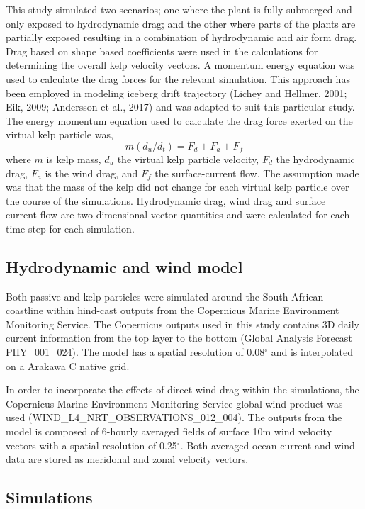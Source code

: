\documentclass[
]{article}
\begin{document}
This study simulated two scenarios; one where the plant is fully
submerged and only exposed to hydrodynamic drag; and the other where
parts of the plants are partially exposed resulting in a combination of
hydrodynamic and air form drag. Drag based on shape based coefficients
were used in the calculations for determining the overall kelp velocity
vectors. A momentum energy equation was used to calculate the drag
forces for the relevant simulation. This approach has been employed in
modeling iceberg drift trajectory (Lichey and Hellmer, 2001; Eik, 2009;
Andersson et al., 2017) and was adapted to suit this particular study.
The energy momentum equation used to calculate the drag force exerted on
the virtual kelp particle was, \[m({d_u/d_t})=F_d + F_a + F_f\] where
\(m\) is kelp mass, \(d_u\) the virtual kelp particle velocity, \(F_d\)
the hydrodynamic drag, \(F_a\) is the wind drag, and \(F_f\) the
surface-current flow. The assumption made was that the mass of the kelp
did not change for each virtual kelp particle over the course of the
simulations. Hydrodynamic drag, wind drag and surface current-flow are
two-dimensional vector quantities and were calculated for each time step
for each simulation.

\hypertarget{hydrodynamic-and-wind-model}{%
\subsection{Hydrodynamic and wind
model}\label{hydrodynamic-and-wind-model}}

Both passive and kelp particles were simulated around the South African
coastline within hind-cast outputs from the Copernicus Marine
Environment Monitoring Service. The Copernicus outputs used in this
study contains 3D daily current information from the top layer to the
bottom (Global Analysis Forecast PHY\_001\_024). The model has a spatial
resolution of 0.08\(^\circ\) and is interpolated on a Arakawa C native
grid.

In order to incorporate the effects of direct wind drag within the
simulations, the Copernicus Marine Environment Monitoring Service global
wind product was used (WIND\_L4\_NRT\_OBSERVATIONS\_012\_004). The
outputs from the model is composed of 6-hourly averaged fields of
surface 10m wind velocity vectors with a spatial resolution of
0.25\(^\circ\). Both averaged ocean current and wind data are stored as
meridonal and zonal velocity vectors.

\hypertarget{simulations}{%
\subsection{Simulations}\label{simulations}}
\end{document}
